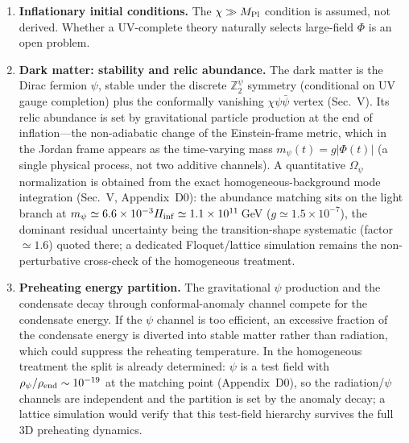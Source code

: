 \documentclass[pdflatex,sn-mathphys-num]{sn-jnl}
\newcommand{\MP}{M_{\rm Pl}}
\newcommand{\Ztwo}{\mathbb{Z}_2}
\newcommand{\Ztwopsi}{\Ztwo^{\psi}}
\theoremstyle{thmstyleone}
\begin{document}
\begin{enumerate}
\item \textbf{Inflationary initial conditions.} The $\chi\gg\MP$ condition is assumed, not derived. Whether a UV-complete theory naturally selects large-field $\Phi$ is an open problem.

\item \textbf{Dark matter: stability and relic abundance.} The dark matter is the Dirac fermion $\psi$, stable under the discrete $\Ztwopsi$ symmetry (conditional on UV gauge completion) plus the conformally vanishing $\chi\psi\bar\psi$ vertex (Sec.~V). Its relic abundance is set by gravitational particle production at the end of inflation---the non-adiabatic change of the Einstein-frame metric, which in the Jordan frame appears as the time-varying mass $m_\psi(t)=g|\Phi(t)|$ (a single physical process, not two additive channels). A quantitative $\Omega_\psi$ normalization is obtained from the exact homogeneous-background mode integration (Sec.~V, Appendix~D0): the abundance matching sits on the light branch at $m_\psi\simeq6.6\times10^{-3}H_{\rm inf}\simeq1.1\times10^{11}\,$GeV ($g\simeq1.5\times10^{-7}$), the dominant residual uncertainty being the transition-shape systematic (factor $\simeq1.6$) quoted there; a dedicated Floquet/lattice simulation remains the non-perturbative cross-check of the homogeneous treatment.

\item \textbf{Preheating energy partition.} The gravitational $\psi$ production and the condensate decay through conformal-anomaly channel compete for the condensate energy. If the $\psi$ channel is too efficient, an excessive fraction of the condensate energy is diverted into stable matter rather than radiation, which could suppress the reheating temperature. In the homogeneous treatment the split is already determined: $\psi$ is a test field with $\rho_\psi/\rho_{\rm end}\sim10^{-19}$ at the matching point (Appendix~D0), so the radiation/$\psi$ channels are independent and the partition is set by the anomaly decay; a lattice simulation would verify that this test-field hierarchy survives the full 3D preheating dynamics.


\end{enumerate}
\end{document}
